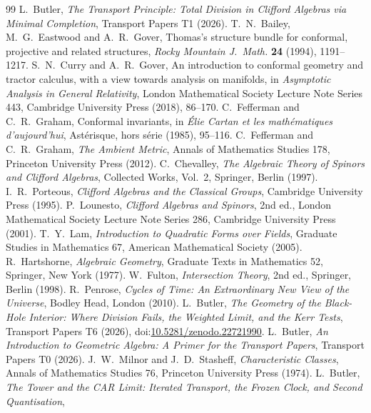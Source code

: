 \documentclass[11pt]{article}
\theoremstyle{definition}
\theoremstyle{plain}
\begin{document}
\begin{thebibliography}{99}
 L.~Butler,
\emph{The Transport Principle: Total Division in Clifford Algebras via Minimal Completion},
Transport Papers T1 (2026).
 T.~N.~Bailey, M.~G.~Eastwood and A.~R.~Gover,
Thomas's structure bundle for conformal, projective and related structures,
\emph{Rocky Mountain J.\ Math.} \textbf{24} (1994), 1191--1217.
 S.~N.~Curry and A.~R.~Gover,
An introduction to conformal geometry and tractor calculus, with a view towards analysis on manifolds,
in \emph{Asymptotic Analysis in General Relativity},
London Mathematical Society Lecture Note Series 443, Cambridge University Press (2018), 86--170.
 C.~Fefferman and C.~R.~Graham,
Conformal invariants,
in \emph{\'Elie Cartan et les math\'ematiques d'aujourd'hui},
Ast\'erisque, hors s\'erie (1985), 95--116.
 C.~Fefferman and C.~R.~Graham,
\emph{The Ambient Metric},
Annals of Mathematics Studies 178, Princeton University Press (2012).
 C.~Chevalley,
\emph{The Algebraic Theory of Spinors and Clifford Algebras},
Collected Works, Vol.~2, Springer, Berlin (1997).
 I.~R.~Porteous,
\emph{Clifford Algebras and the Classical Groups},
Cambridge University Press (1995).
 P.~Lounesto,
\emph{Clifford Algebras and Spinors}, 2nd ed.,
London Mathematical Society Lecture Note Series 286, Cambridge University Press (2001).
 T.~Y.~Lam,
\emph{Introduction to Quadratic Forms over Fields},
Graduate Studies in Mathematics 67, American Mathematical Society (2005).
 R.~Hartshorne,
\emph{Algebraic Geometry},
Graduate Texts in Mathematics 52, Springer, New York (1977).
 W.~Fulton,
\emph{Intersection Theory}, 2nd ed.,
Springer, Berlin (1998).
 R.~Penrose,
\emph{Cycles of Time: An Extraordinary New View of the Universe},
Bodley Head, London (2010).
 L.~Butler,
\emph{The Geometry of the Black-Hole Interior: Where Division Fails, the Weighted Limit, and the Kerr Tests},
Transport Papers T6 (2026), doi:\href{https://doi.org/10.5281/zenodo.22721990}{10.5281/zenodo.22721990}.
 L.~Butler,
\emph{An Introduction to Geometric Algebra: A Primer for the Transport Papers},
Transport Papers T0 (2026).
 J.~W.~Milnor and J.~D.~Stasheff,
\emph{Characteristic Classes},
Annals of Mathematics Studies 76, Princeton University Press (1974).
 L.~Butler,
\emph{The Tower and the CAR Limit: Iterated Transport, the Frozen Clock, and Second Quantisation},

\end{thebibliography}
\end{document}
